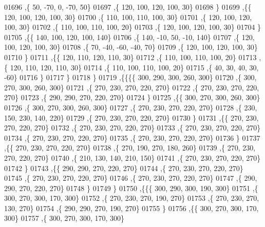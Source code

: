 \begin{DoxyCode}
01696     ,\{    50,   -70,     0,   -70,    50\}
01697     ,\{   120,   100,   120,   100,    30\}
01698     \}
01699    ,\{\{   120,   100,   120,   100,    30\}
01700     ,\{   110,   100,   110,   100,    30\}
01701     ,\{   120,   100,   120,   100,    30\}
01702     ,\{   110,   100,   110,   100,    20\}
01703     ,\{   120,   100,   120,   100,    30\}
01704     \}
01705    ,\{\{   140,   100,   120,   100,   140\}
01706     ,\{   140,   -10,    50,   -10,   140\}
01707     ,\{   120,   100,   120,   100,    30\}
01708     ,\{    70,   -40,   -60,   -40,    70\}
01709     ,\{   120,   100,   120,   100,    30\}
01710     \}
01711    ,\{\{   120,   110,   120,   110,    30\}
01712     ,\{   110,   100,   110,   100,    20\}
01713     ,\{   120,   110,   120,   110,    30\}
01714     ,\{   110,   100,   110,   100,    20\}
01715     ,\{    40,    30,    40,    30,   -60\}
01716     \}
01717    \}
01718   \}
01719  ,\{\{\{\{   300,   290,   300,   260,   300\}
01720     ,\{   300,   270,   300,   260,   300\}
01721     ,\{   270,   230,   270,   220,   270\}
01722     ,\{   270,   230,   270,   220,   270\}
01723     ,\{   290,   290,   270,   220,   270\}
01724     \}
01725    ,\{\{   300,   270,   300,   260,   300\}
01726     ,\{   300,   270,   300,   260,   300\}
01727     ,\{   270,   230,   270,   220,   270\}
01728     ,\{   230,   150,   230,   140,   220\}
01729     ,\{   270,   230,   270,   220,   270\}
01730     \}
01731    ,\{\{   270,   230,   270,   220,   270\}
01732     ,\{   270,   230,   270,   220,   270\}
01733     ,\{   270,   230,   270,   220,   270\}
01734     ,\{   270,   230,   270,   220,   270\}
01735     ,\{   270,   230,   270,   220,   270\}
01736     \}
01737    ,\{\{   270,   230,   270,   220,   270\}
01738     ,\{   270,   190,   270,   180,   260\}
01739     ,\{   270,   230,   270,   220,   270\}
01740     ,\{   210,   130,   140,   210,   150\}
01741     ,\{   270,   230,   270,   220,   270\}
01742     \}
01743    ,\{\{   290,   290,   270,   220,   270\}
01744     ,\{   270,   230,   270,   220,   270\}
01745     ,\{   270,   230,   270,   220,   270\}
01746     ,\{   270,   230,   270,   220,   270\}
01747     ,\{   290,   290,   270,   220,   270\}
01748     \}
01749    \}
01750   ,\{\{\{   300,   290,   300,   190,   300\}
01751     ,\{   300,   270,   300,   170,   300\}
01752     ,\{   270,   230,   270,   190,   270\}
01753     ,\{   270,   230,   270,   130,   270\}
01754     ,\{   290,   290,   270,   190,   270\}
01755     \}
01756    ,\{\{   300,   270,   300,   170,   300\}
01757     ,\{   300,   270,   300,   170,   300\}

\end{DoxyCode}
